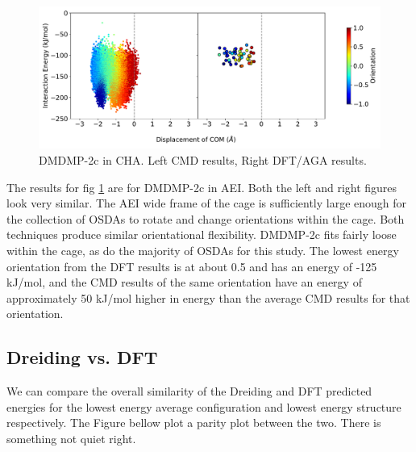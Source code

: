 \documentclass[journal=accacs,manuscript=article, email=true, layout=traditional]{achemso}
\begin{document}
\begin{figure}
\begin{center}

\includegraphics[scale=.5]{./Figures/AEI-GA-CMD-DMDMP_2c.pdf}
\caption{DMDMP-2c in CHA. Left CMD results, Right DFT/AGA results.} 
\label{fig:DMDMP-2c-AEI} 

\end{center}
\end{figure}

The results for fig \ref{fig:DMDMP-2c-AEI} are for DMDMP-2c in AEI. Both the left and right figures look very similar. The AEI wide frame of the cage is sufficiently large enough for the collection of OSDAs to rotate and change orientations within the cage. Both techniques produce similar orientational flexibility. DMDMP-2c fits fairly loose within the cage, as do the majority of OSDAs for this study. The lowest energy orientation from the DFT results is at about 0.5 and has an energy of -125 kJ/mol, and the CMD results of the same orientation have an energy of approximately 50 kJ/mol higher in energy than the average CMD results for that orientation. 

\subsection{Dreiding vs. DFT}
\label{sec:org1bc840c}
We can compare the overall similarity of the Dreiding and DFT predicted energies for the lowest energy average configuration and lowest energy structure respectively. The Figure bellow plot a parity plot between the two. There is something not quiet right.
\end{document}
